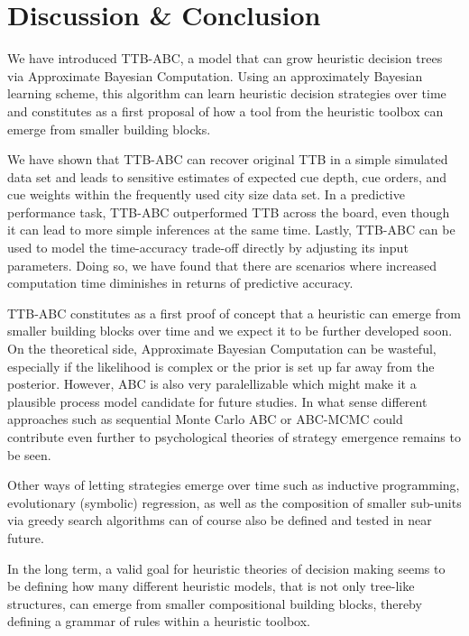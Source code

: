\documentclass[a4paper,man, natbib]{apa6}
\begin{document}

\section{Discussion \& Conclusion}
We have introduced TTB-ABC, a model that can grow heuristic decision trees via Approximate Bayesian Computation. Using an approximately Bayesian learning scheme, this algorithm can learn heuristic decision strategies over time and constitutes as a first proposal of how a tool from the heuristic toolbox can emerge from smaller building blocks.

We have shown that TTB-ABC can recover original TTB in a simple simulated data set and leads to sensitive estimates of expected cue depth, cue orders, and cue weights within the frequently used city size data set. In a predictive performance task, TTB-ABC outperformed TTB across the board, even though it can lead to more simple inferences at the same time. Lastly, TTB-ABC can be used to model the time-accuracy trade-off directly by adjusting its input parameters. Doing so, we have found that there are scenarios where increased computation time diminishes in returns of predictive accuracy.

TTB-ABC constitutes as a first proof of concept that a heuristic can emerge from smaller building blocks over time and we expect it to be further developed soon. On the theoretical side, Approximate Bayesian Computation can be wasteful, especially if the likelihood is complex or the prior is set up far away from the posterior.  However, ABC is also very paralellizable which might make it a plausible process model candidate for future studies. In what sense different approaches such as sequential Monte Carlo ABC or ABC-MCMC could contribute even further to psychological theories of strategy emergence remains to be seen.

Other ways of letting strategies emerge over time such as inductive programming, evolutionary (symbolic) regression, as well as the composition of smaller sub-units via greedy search algorithms can of course also be defined and tested in near future.

In the long term, a valid goal for heuristic theories of decision making seems to be defining how many different heuristic models, that is not only tree-like structures, can emerge from smaller compositional building blocks, thereby defining a grammar of rules within a heuristic toolbox.



\end{document}
